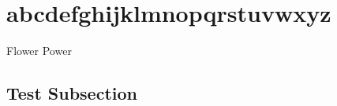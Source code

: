 \documentclass[12pt]{scrartcl}
\begin{document}
  \section{abcdefghijklmnopqrstuvwxyz}
  Flower Power
  \subsection{Test Subsection}
\end{document}
